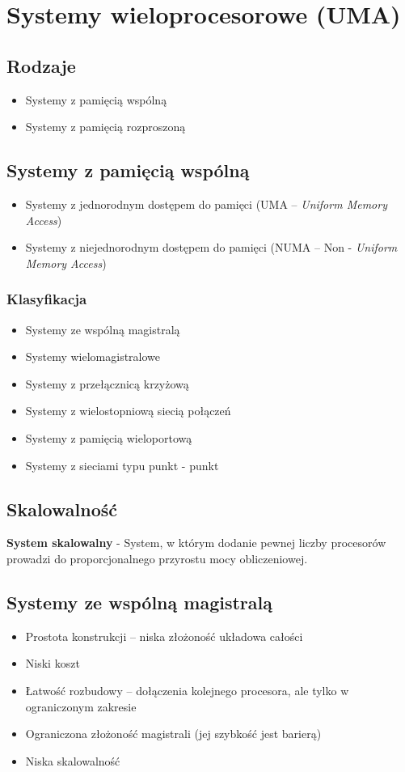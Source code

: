 \documentclass[a4paper,twoside]{article}
\begin{document}
\section{Systemy wieloprocesorowe (UMA)}
\begin{samepage}
	\subsection{Rodzaje}
	\begin{itemize}
		\item Systemy z pamięcią wspólną
		\item Systemy z pamięcią rozproszoną
	\end{itemize}
	\subsection{Systemy z pamięcią wspólną}
	\begin{itemize}
		\item Systemy z jednorodnym dostępem do pamięci (UMA – \emph{Uniform Memory Access})
		\item Systemy z niejednorodnym dostępem do pamięci (NUMA – Non 	- \emph{Uniform Memory Access})
	\end{itemize}
\end{samepage}
\subsubsection{Klasyfikacja} \label{subsubsec:klasyfikacjaUMA}
\begin{itemize}
	\item Systemy ze wspólną magistralą
	\item Systemy wielomagistralowe
	\item Systemy z przełącznicą krzyżową
	\item Systemy z wielostopniową siecią połączeń
	\item Systemy z pamięcią wieloportową
	\item Systemy z sieciami typu punkt - punkt
\end{itemize}
\subsection{Skalowalność}
\textbf{System skalowalny} - System, w którym dodanie pewnej liczby procesorów prowadzi do proporcjonalnego przyrostu mocy obliczeniowej.
\subsection{Systemy ze wspólną magistralą}
\begin{itemize}
	\item Prostota konstrukcji – niska złożoność układowa całości
	\item Niski koszt
	\item Łatwość rozbudowy – dołączenia kolejnego procesora, ale tylko w ograniczonym zakresie
	\item Ograniczona złożoność magistrali (jej szybkość jest barierą)
	\item Niska skalowalność
\end{itemize}
\end{document}
